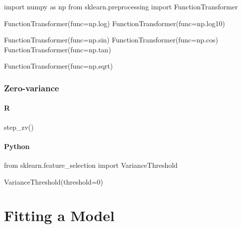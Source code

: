 \documentclass[
  letterpaper,
  DIV=11,
  numbers=noendperiod]{scrreprt}
\newenvironment{Shaded}{\begin{snugshade}}{\end{snugshade}}
\newcommand{\DecValTok}[1]{\textcolor[rgb]{0.68,0.00,0.00}{#1}}
\newcommand{\FunctionTok}[1]{\textcolor[rgb]{0.28,0.35,0.67}{#1}}
\newcommand{\ImportTok}[1]{\textcolor[rgb]{0.00,0.46,0.62}{#1}}
\newcommand{\NormalTok}[1]{\textcolor[rgb]{0.00,0.46,0.62}{#1}}
\newcommand{\OperatorTok}[1]{\textcolor[rgb]{0.37,0.37,0.37}{#1}}
\begin{document}
\begin{Shaded}
\begin{Highlighting}[]
\ImportTok{import}\NormalTok{ numpy }\ImportTok{as}\NormalTok{ np}
\ImportTok{from}\NormalTok{ sklearn.preprocessing }\ImportTok{import}\NormalTok{ FunctionTransformer}

\NormalTok{FunctionTransformer(func}\OperatorTok{=}\NormalTok{np.log)}
\NormalTok{FunctionTransformer(func}\OperatorTok{=}\NormalTok{np.log10)}

\NormalTok{FunctionTransformer(func}\OperatorTok{=}\NormalTok{np.sin)}
\NormalTok{FunctionTransformer(func}\OperatorTok{=}\NormalTok{np.cos)}
\NormalTok{FunctionTransformer(func}\OperatorTok{=}\NormalTok{np.tan)}

\NormalTok{FunctionTransformer(func}\OperatorTok{=}\NormalTok{np.sqrt)}
\end{Highlighting}
\end{Shaded}

\hypertarget{zero-variance}{%
\subsection{Zero-variance}\label{zero-variance}}

\hypertarget{r-70}{%
\subsubsection{R}\label{r-70}}

\begin{Shaded}
\begin{Highlighting}[]
\FunctionTok{step\_zv}\NormalTok{()}
\end{Highlighting}
\end{Shaded}

\hypertarget{python-70}{%
\subsubsection{Python}\label{python-70}}

\begin{Shaded}
\begin{Highlighting}[]
\ImportTok{from}\NormalTok{ sklearn.feature\_selection }\ImportTok{import}\NormalTok{ VarianceThreshold}

\NormalTok{VarianceThreshold(threshold}\OperatorTok{=}\DecValTok{0}\NormalTok{)}
\end{Highlighting}
\end{Shaded}

\hypertarget{fitting-a-model}{%
\chapter{Fitting a Model}\label{fitting-a-model}}
\end{document}
